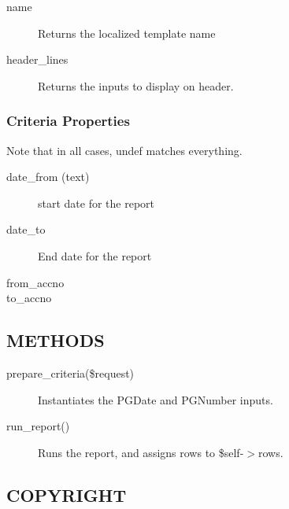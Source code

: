 \begin{description}
\begin{description}
\begin{description}
\begin{description}
\begin{description}
\begin{description}
\begin{description}
\begin{description}
\begin{description}
\begin{description}
\begin{description}
\item[{name}] \mbox{}

Returns the localized template name


\item[{header\_lines}] \mbox{}

Returns the inputs to display on header.

\end{description}
\subsubsection*{Criteria Properties\label{LedgerSMB::DBObject::Report::co::Caja_Diaria_Criteria_Properties}}


Note that in all cases, undef matches everything.

\begin{description}

\item[{date\_from (text)}] \mbox{}

start date for the report


\item[{date\_to}] \mbox{}

End date for the report


\item[{from\_accno}] \mbox{}
\item[{to\_accno}] \mbox{}\end{description}
\subsection*{METHODS\label{LedgerSMB::DBObject::Report::co::Caja_Diaria_METHODS}}
\begin{description}

\item[{prepare\_criteria(\$request)}] \mbox{}

Instantiates the PGDate and PGNumber inputs.


\item[{run\_report()}] \mbox{}

Runs the report, and assigns rows to \$self-$>$rows.

\end{description}
\subsection*{COPYRIGHT\label{LedgerSMB::DBObject::Report::co::Caja_Diaria_COPYRIGHT}}



\end{description}
\end{description}
\end{description}
\end{description}
\end{description}
\end{description}
\end{description}
\end{description}
\end{description}
\end{description}
